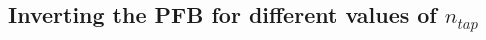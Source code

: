 \documentclass[12pt]{article}
\newcommand{\ntap}{n_{tap}}
\begin{document}
% 
% 
% 
% 
% 
% 
% 
% 
% 
% 


\subsection{Inverting the PFB for different values of $\ntap$}\label{sec:eigenvalues different ntaps}
\end{document}
